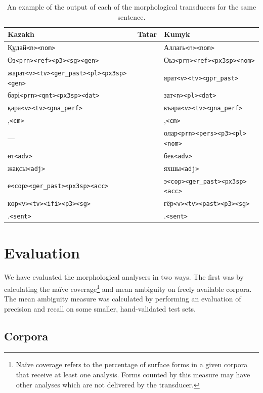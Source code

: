 \documentclass[a4paper,11pt,twocolumn]{article}
\newcommand{\tags}[1]{\texttt{#1}}
\begin{document}
\begin{table}
\begin{tabular}{lll}
 \textbf{Kazakh} & \textbf{Tatar} & \textbf{Kumyk} \\
\hline
 Құдай\tags{<n><nom>} &  & Аллагь\tags{<n><nom>}  \\
 Өз\tags{<prn><ref><p3><sg><gen>} & & Оьз\tags{<prn><ref><px3sp><nom>} \\
 жарат\tags{<v><tv><ger\_past><pl><px3sp><gen>} & & ярат\tags{<v><tv><gpr\_past>} \\
 бәрі\tags{<prn><qnt><px3sp><dat>} & & зат\tags{<n><pl><dat>} \\
 қара\tags{<v><tv><gna\_perf>} & & къара\tags{<v><tv><gna\_perf>} \\ 
 ,\tags{<cm>} & & ,\tags{<cm>} \\
 ---      & & олар\tags{<prn><pers><p3><pl><nom>} \\
 өт\tags{<adv>} & & бек\tags{<adv>} \\
 жақсы\tags{<adj>} & & яхшы\tags{<adj>} \\
 е\tags{<cop><ger\_past><px3sp><acc>} & & э\tags{<cop><ger\_past><px3sp><acc>} \\
 көр\tags{<v><tv><ifi><p3><sg>} & & гёр\tags{<v><tv><past><p3><sg>} \\  
 .\tags{<sent>} & & .\tags{<sent>} \\
\hline
\end{tabular}

\label{table:exoutput}
\caption{An example of the output of each of the morphological transducers for the same sentence.}

\end{table}

\section{Evaluation}

We have evaluated the morphological analysers in two ways. The first was by calculating the naïve coverage\footnote{Naïve coverage refers to the percentage of surface forms in a given corpora that receive at least one analysis.  Forms counted by this measure may have other analyses which are not delivered by the transducer.} and mean ambiguity  on freely available corpora. The mean ambiguity measure was calculated by performing an evaluation of precision and recall on some smaller, hand-validated test sets.

\subsection{Corpora}
\end{document}
